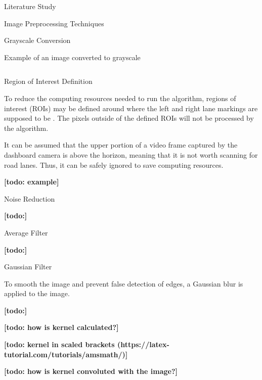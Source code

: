 \documentclass{matthijs}
\begin{document}
\begin{hoofdstuk}{Literature Study}
\begin{paragraaf}{Image Preprocessing Techniques}
\begin{subparagraaf}{Grayscale Conversion}
\begin{figuur}{Example of an image converted to grayscale}
\begin{tabular}{ccc}
					\end{tabular}

				\end{figuur}
			
			\end{subparagraaf}

			\begin{subparagraaf}{Region of Interest Definition}

				To reduce the computing resources needed to run the algorithm, regions of interest (ROIs) may be defined around where the left and right lane markings are supposed to be \cite{el2020novel}.
				The pixels outside of the defined ROIs will not be processed by the algorithm.
				
				\bigskip

				It can be assumed that the upper portion of a video frame captured by the dashboard camera is above the horizon, meaning that it is not worth scanning for road lanes.
				Thus, it can be safely ignored to save computing resources.

				\textbf{[todo: example]}

			\end{subparagraaf}

			\begin{subparagraaf}{Noise Reduction}

				\textbf{[todo:]}

				\begin{subsubparagraaf}{Average Filter}

					\textbf{[todo:]}
				
				\end{subsubparagraaf}

				\begin{subsubparagraaf}{Gaussian Filter}

					To smooth the image and prevent false detection of edges, a Gaussian blur is applied to the image.

					\bigskip

					\textbf{[todo:]}

					\textbf{[todo: how is kernel calculated?]}

					\textbf{[todo: kernel in scaled brackets (https://latex-tutorial.com/tutorials/amsmath/)]}

					\textbf{[todo: how is kernel convoluted with the image?]}

					\bigskip


\end{subsubparagraaf}
\end{subparagraaf}
\end{paragraaf}
\end{hoofdstuk}
\end{document}
